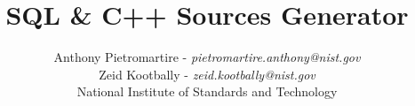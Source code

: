 \title{SQL \& C++ Sources Generator}
\author{Anthony Pietromartire - \emph{pietromartire.anthony{@}nist.gov}\\
	Zeid Kootbally - \emph{zeid.kootbally{@}nist.gov}\\ National Institute of Standards and Technology\\
        }
